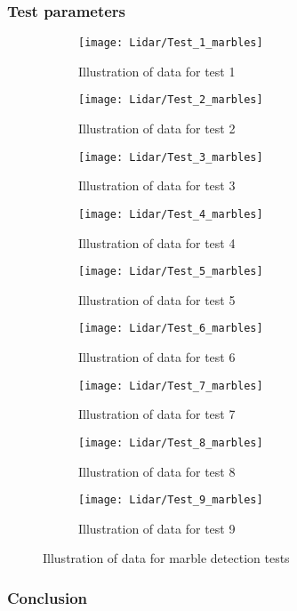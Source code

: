 \documentclass[../Head/Main.tex]{subfiles}
\begin{document}
\subsubsection{Test parameters}
\begin{figure}[H]
  \begin{subfigure}[b]{0.3\textwidth}
  	\centering
    \texttt{[image: Lidar/Test\_1\_marbles]}
    \caption{Illustration of data for test 1}
    \label{fig:Marbletest1}
  \end{subfigure}
  \hfill
  \begin{subfigure}[b]{0.3\textwidth}
  	\centering
    \texttt{[image: Lidar/Test\_2\_marbles]}
    \caption{Illustration of data for test 2}
    \label{fig:Marblestest2}
  \end{subfigure}
  \hfill
  \begin{subfigure}[b]{0.3\textwidth}
    \centering
    \texttt{[image: Lidar/Test\_3\_marbles]}
    \caption{Illustration of data for test 3}
    \label{fig:Marblestest3}
  \end{subfigure}
  \hfill
  \begin{subfigure}[b]{0.3\textwidth}
    \centering
    \texttt{[image: Lidar/Test\_4\_marbles]}
    \caption{Illustration of data for test 4}
    \label{fig:Marblestest4}
  \end{subfigure}
  \hfill
  \begin{subfigure}[b]{0.3\textwidth}
    \centering
    \texttt{[image: Lidar/Test\_5\_marbles]}
    \caption{Illustration of data for test 5}
    \label{fig:Marblestest5}
  \end{subfigure}
  \hfill
  \begin{subfigure}[b]{0.3\textwidth}
    \centering
    \texttt{[image: Lidar/Test\_6\_marbles]}
    \caption{Illustration of data for test 6}
    \label{fig:Marblestest6}
  \end{subfigure}
  \hfill
  \begin{subfigure}[b]{0.3\textwidth}
    \centering
    \texttt{[image: Lidar/Test\_7\_marbles]}
    \caption{Illustration of data for test 7}
    \label{fig:Marblestest7}
  \end{subfigure}
  \hfill
  \begin{subfigure}[b]{0.3\textwidth}
    \centering
    \texttt{[image: Lidar/Test\_8\_marbles]}
    \caption{Illustration of data for test 8}
    \label{fig:Marblestest8}
  \end{subfigure}
  \hfill
  \begin{subfigure}[b]{0.3\textwidth}
    \centering
    \texttt{[image: Lidar/Test\_9\_marbles]}
    \caption{Illustration of data for test 9}
    \label{fig:Marblestest9}
  \end{subfigure}
  \caption{Illustration of data for marble detection tests}
  \label{fig:Marblestests}
\end{figure}

\subsubsection{Conclusion}
\end{document}

